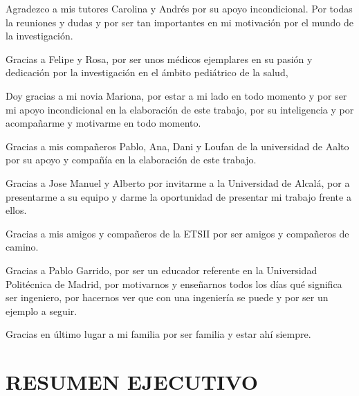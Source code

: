 \documentclass[a4paper, 11pt, spanish, twoside]{article}
\newcommand\blankpage{%
    \null
    \thispagestyle{empty}%
    \newpage}
\begin{document}
Agradezco a mis tutores Carolina y Andrés por su apoyo incondicional. Por todas la reuniones y dudas y por ser tan importantes en mi motivación por el mundo de la investigación.  

Gracias a Felipe y Rosa, por ser unos médicos ejemplares en su pasión y dedicación por la investigación en el ámbito pediátrico de la salud,

Doy gracias a mi novia Mariona, por estar a mi lado en todo momento y por ser mi apoyo incondicional en la elaboración de este trabajo, por su inteligencia y por acompañarme y motivarme en todo momento. 

Gracias a mis compañeros Pablo, Ana, Dani y Loufan de la universidad de Aalto por su apoyo y compañía en la elaboración de este trabajo. 

Gracias a Jose Manuel y Alberto por invitarme a la Universidad de Alcalá, por a presentarme a su equipo y darme la oportunidad de presentar mi trabajo frente a ellos.

Gracias a mis amigos y compañeros de la ETSII por ser amigos y compañeros de camino.

Gracias a Pablo Garrido, por ser un educador referente en la Universidad Politécnica de Madrid, por motivarnos y enseñarnos todos los días qué significa ser ingeniero, por hacernos ver que con una ingeniería se puede y por ser un ejemplo a seguir.

Gracias en último lugar a mi familia por ser familia y estar ahí siempre.

\newpage



\section*{RESUMEN EJECUTIVO} %

\afterpage{\blankpage} %
\end{document}
